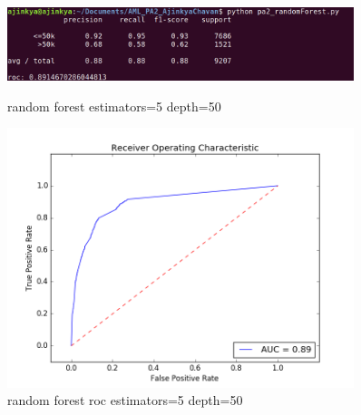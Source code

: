 \documentclass{article}
\begin{document}
\begin{figure}
    \centering
    \begin{minipage}{0.45\textwidth}
        \centering
        \includegraphics[width=0.9\textwidth]{random_5_50.png} %
        \caption{random forest estimators=5 depth=50}
    \end{minipage}\hfill
    \begin{minipage}{0.45\textwidth}
        \centering
        \includegraphics[width=0.9\textwidth]{roc_random_5_50.png} %
        \caption{random forest roc estimators=5 depth=50}
    \end{minipage}
\end{figure}
\end{document}
